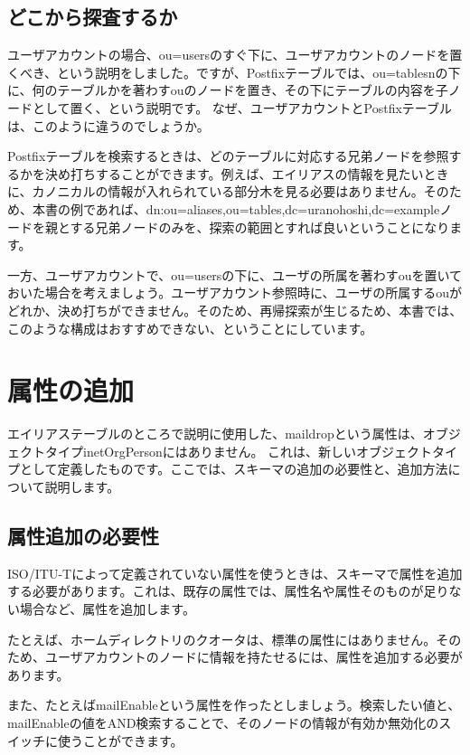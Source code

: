 \subsection{どこから探査するか}

ユーザアカウントの場合、ou=usersのすぐ下に、ユーザアカウントのノードを置くべき、という説明をしました。ですが、Postfixテーブルでは、ou=tablesnの下に、何のテーブルかを著わすouのノードを置き、その下にテーブルの内容を子ノードとして置く、という説明です。
なぜ、ユーザアカウントとPostfixテーブルは、このように違うのでしょうか。

Postfixテーブルを検索するときは、どのテーブルに対応する兄弟ノードを参照するかを決め打ちすることができます。例えば、エイリアスの情報を見たいときに、カノニカルの情報が入れられている部分木を見る必要はありません。そのため、本書の例であれば、dn:ou=aliases,ou=tables,dc=uranohoshi,dc=exampleノードを親とする兄弟ノードのみを、探索の範囲とすれば良いということになります。

一方、ユーザアカウントで、ou=usersの下に、ユーザの所属を著わすouを置いておいた場合を考えましょう。ユーザアカウント参照時に、ユーザの所属するouがどれか、決め打ちができません。そのため、再帰探索が生じるため、本書では、このような構成はおすすめできない、ということにしています。

\section{属性の追加}

エイリアステーブルのところで説明に使用した、maildropという属性は、オブジェクトタイプinetOrgPersonにはありません。
これは、新しいオブジェクトタイプとして定義したものです。ここでは、スキーマの追加の必要性と、追加方法について説明します。

\subsection{属性追加の必要性}

ISO/ITU-Tによって定義されていない属性を使うときは、スキーマで属性を追加する必要があります。これは、既存の属性では、属性名や属性そのものが足りない場合など、属性を追加します。

たとえば、ホームディレクトリのクオータは、標準の属性にはありません。そのため、ユーザアカウントのノードに情報を持たせるには、属性を追加する必要があります。

また、たとえばmailEnableという属性を作ったとしましょう。検索したい値と、mailEnableの値をAND検索することで、そのノードの情報が有効か無効化のスイッチに使うことができます。


